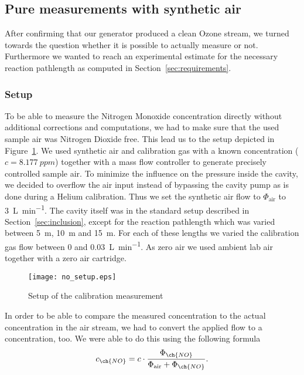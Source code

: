 \subsection{Pure  measurements with synthetic air}
\label{sec:no}

After confirming that our generator produced a clean Ozone stream, we
turned towards the question whether it is possible to actually measure
 or not. Furthermore we wanted to reach an experimental
estimate for the necessary reaction pathlength as computed in
Section~\ref{sec:requirements}.

\subsubsection{Setup}
\label{sec:no-setup}

To be able to measure the Nitrogen Monoxide concentration directly
without additional corrections and computations, we had to make sure
that the used sample air was Nitrogen Dioxide free. This lead us to
the setup depicted in Figure~\ref{fig:no-setup}. We used synthetic air
and  calibration gas with a known  concentration ($c =
\SI{8.177}{ppm}$) together with a mass flow controller to generate
precisely controlled sample air. To minimize the influence on the
pressure inside the cavity, we decided to overflow the air input
instead of bypassing the cavity pump as is done during a Helium
calibration. Thus we set the synthetic air flow to $\Phi_{\text{air}}$
to \SI{3}{\liter\per\minute}. The cavity itself was in the standard
setup described in Section~\ref{sec:inclusion}, except for the
reaction pathlength which was varied between \SI{5}{\meter},
\SI{10}{\meter} and \SI{15}{\meter}. For each of these lengths we
varied the  calibration gas flow between \num{0} and
\SI{0.03}{\liter\per\minute}. As zero air we used ambient lab air
together with a zero air cartridge.

\begin{figure}[htbp]
  \centering
  \texttt{[image: no\_setup.eps]}
  \caption{Setup of the calibration measurement}
  \label{fig:no-setup}
\end{figure}

In order to be able to compare the measured  concentration to the
actual concentration in the air stream, we had to convert the applied
 flow to a concentration, too. We were able to do this using the
following formula
\begin{align}
  c_{\ch{NO}} = c \cdot \frac{\Phi_{\ch{NO}}}{\Phi_{\text{air}} +
  \Phi_{\ch{NO}}}. \label{eq:c-flow}
\end{align}

